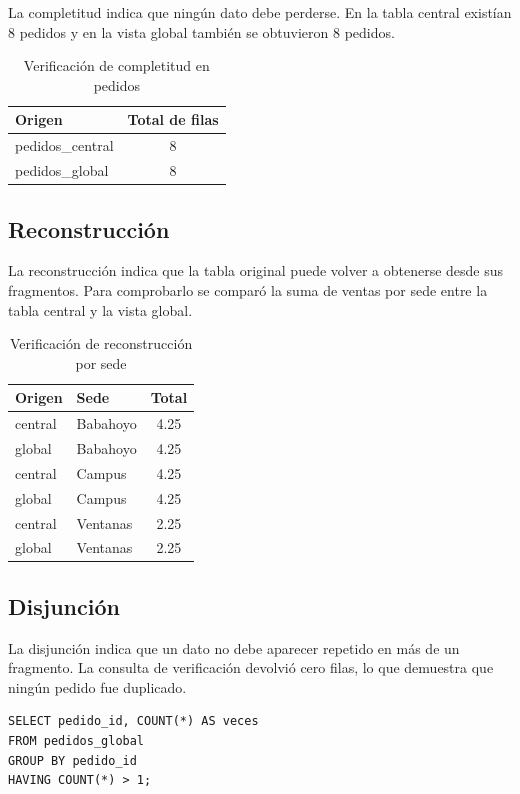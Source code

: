 \documentclass[12pt,a4paper]{article}
\begin{document}
La completitud indica que ningún dato debe perderse. En la tabla central existían 8 pedidos y en la vista global también se obtuvieron 8 pedidos.

\begin{table}[H]
\centering
\caption{Verificación de completitud en pedidos}
\begin{tabular}{lc}
\toprule
\textbf{Origen} & \textbf{Total de filas} \\
\midrule
pedidos\_central & 8 \\
pedidos\_global & 8 \\
\bottomrule
\end{tabular}
\end{table}

\subsection{Reconstrucción}

La reconstrucción indica que la tabla original puede volver a obtenerse desde sus fragmentos. Para comprobarlo se comparó la suma de ventas por sede entre la tabla central y la vista global.

\begin{table}[H]
\centering
\caption{Verificación de reconstrucción por sede}
\begin{tabular}{llc}
\toprule
\textbf{Origen} & \textbf{Sede} & \textbf{Total} \\
\midrule
central & Babahoyo & 4.25 \\
global & Babahoyo & 4.25 \\
central & Campus & 4.25 \\
global & Campus & 4.25 \\
central & Ventanas & 2.25 \\
global & Ventanas & 2.25 \\
\bottomrule
\end{tabular}
\end{table}

\subsection{Disjunción}

La disjunción indica que un dato no debe aparecer repetido en más de un fragmento. La consulta de verificación devolvió cero filas, lo que demuestra que ningún pedido fue duplicado.

\begin{lstlisting}
SELECT pedido_id, COUNT(*) AS veces
FROM pedidos_global
GROUP BY pedido_id
HAVING COUNT(*) > 1;
\end{lstlisting}
\end{document}
